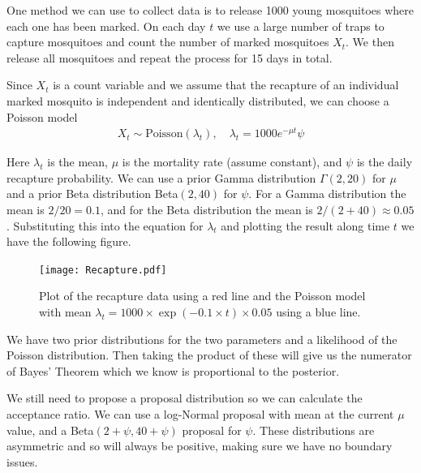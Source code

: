 \documentclass[12pt,twoside]{report}   %
\begin{document}
One method we can use to collect data is to release 1000 young mosquitoes where each one has been marked. On each day $t$ we use a large number of traps to capture mosquitoes and count the number of marked mosquitoes $X_t$. We then release all mosquitoes and repeat the process for 15 days in total.

Since $X_t$ is a count variable and we assume that the recapture of an individual marked mosquito is independent and identically distributed, we can choose a Poisson model
\begin{align}
X_t\sim\text{Poisson}(\lambda_t),\quad\lambda_t = 1000e^{-\mu t}\psi\label{2.2}
\end{align}

Here $\lambda_t$ is the mean, $\mu$ is the mortality rate (assume constant), and $\psi$ is the daily recapture probability. We can use a prior Gamma distribution $\Gamma(2,20)$ for $\mu$ and a prior Beta distribution Beta$(2,40)$ for $\psi$. For a Gamma distribution the mean is $2/20 = 0.1$, and for the Beta distribution the mean is $2/(2+40)\approx0.05$. Substituting this into the equation for $\lambda_t$ and plotting the result along time $t$ we have the following figure.
\begin{figure}[H]
\centering
\texttt{[image: Recapture.pdf]}
\caption{Plot of the recapture data using a red line and the Poisson model with mean $\lambda_t = 1000\times\exp(-0.1\times t)\times0.05$ using a blue line.}
\label{fig1.6}
\end{figure}

We have two prior distributions for the two parameters and a likelihood of the Poisson distribution. Then taking the product of these will give us the numerator of Bayes' Theorem which we know is proportional to the posterior.

We still need to propose a proposal distribution so we can calculate the acceptance ratio. We can use a log-Normal proposal with mean at the current $\mu$ value, and a Beta$(2+\psi,40+\psi)$ proposal for $\psi$. These distributions are asymmetric and so will always be positive, making sure we have no boundary issues.
\end{document}
